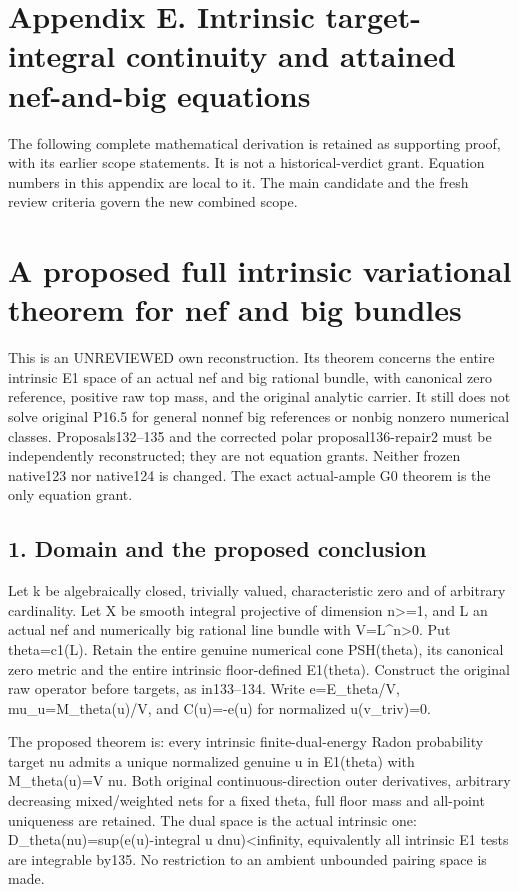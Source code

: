 \documentclass[
  10pt,
]{article}
\begin{document}
\section{Appendix E. Intrinsic target-integral continuity and attained
nef-and-big
equations}\label{appendix-e.-intrinsic-target-integral-continuity-and-attained-nef-and-big-equations}

The following complete mathematical derivation is retained as supporting
proof, with its earlier scope statements. It is not a historical-verdict
grant. Equation numbers in this appendix are local to it. The main
candidate and the fresh review criteria govern the new combined scope.

\section{A proposed full intrinsic variational theorem for nef and big
bundles}\label{a-proposed-full-intrinsic-variational-theorem-for-nef-and-big-bundles}

This is an UNREVIEWED own reconstruction. Its theorem concerns the
entire intrinsic E1 space of an actual nef and big rational bundle, with
canonical zero reference, positive raw top mass, and the original
analytic carrier. It still does not solve original P16.5 for general
nonnef big references or nonbig nonzero numerical classes.
Proposals132--135 and the corrected polar proposal136-repair2 must be
independently reconstructed; they are not equation grants. Neither
frozen native123 nor native124 is changed. The exact actual-ample G0
theorem is the only equation grant.

\subsection{1. Domain and the proposed
conclusion}\label{domain-and-the-proposed-conclusion}

Let k be algebraically closed, trivially valued, characteristic zero and
of arbitrary cardinality. Let X be smooth integral projective of
dimension n\textgreater=1, and L an actual nef and numerically big
rational line bundle with V=L\^{}n\textgreater0. Put theta=c1(L). Retain
the entire genuine numerical cone PSH(theta), its canonical zero metric
and the entire intrinsic floor-defined E1(theta). Construct the original
raw operator before targets, as in133--134. Write e=E\_theta/V,
mu\_u=M\_theta(u)/V, and C(u)=-e(u) for normalized u(v\_triv)=0.

The proposed theorem is: every intrinsic finite-dual-energy Radon
probability target nu admits a unique normalized genuine u in E1(theta)
with M\_theta(u)=V nu. Both original continuous-direction outer
derivatives, arbitrary decreasing mixed/weighted nets for a fixed theta,
full floor mass and all-point uniqueness are retained. The dual space is
the actual intrinsic one: D\_theta(nu)=sup(e(u)-integral u
dnu)\textless infinity, equivalently all intrinsic E1 tests are
integrable by135. No restriction to an ambient unbounded pairing space
is made.
\end{document}
